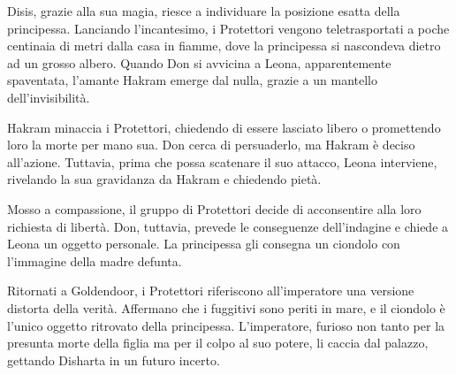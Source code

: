 Disis, grazie alla sua magia, riesce a individuare la posizione esatta
della principessa. Lanciando l'incantesimo, i Protettori vengono
teletrasportati a poche centinaia di metri dalla casa in fiamme, dove la
principessa si nascondeva dietro ad un grosso albero. Quando Don si
avvicina a Leona, apparentemente spaventata, l'amante Hakram emerge dal
nulla, grazie a un mantello dell'invisibilità.

Hakram minaccia i Protettori, chiedendo di essere lasciato libero o
promettendo loro la morte per mano sua. Don cerca di persuaderlo, ma
Hakram è deciso all'azione. Tuttavia, prima che possa scatenare il suo
attacco, Leona interviene, rivelando la sua gravidanza da Hakram e
chiedendo pietà.

Mosso a compassione, il gruppo di Protettori decide di acconsentire alla
loro richiesta di libertà. Don, tuttavia, prevede le conseguenze
dell'indagine e chiede a Leona un oggetto personale. La principessa gli
consegna un ciondolo con l'immagine della madre defunta.

Ritornati a Goldendoor, i Protettori riferiscono all'imperatore una
versione distorta della verità. Affermano che i fuggitivi sono periti in
mare, e il ciondolo è l'unico oggetto ritrovato della principessa.
L'imperatore, furioso non tanto per la presunta morte della figlia ma
per il colpo al suo potere, li caccia dal palazzo, gettando Disharta in
un futuro incerto.

